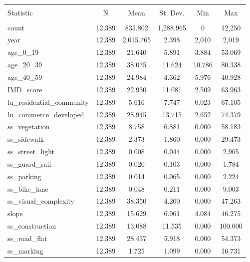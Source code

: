 
\begin{table}[!htbp] \centering 
  \caption{} 
  \label{} 
\begin{tabular}{@{\extracolsep{5pt}}lccccc} 
\\[-1.8ex]\hline 
\hline \\[-1.8ex] 
Statistic & \multicolumn{1}{c}{N} & \multicolumn{1}{c}{Mean} & \multicolumn{1}{c}{St. Dev.} & \multicolumn{1}{c}{Min} & \multicolumn{1}{c}{Max} \\ 
\hline \\[-1.8ex] 
count & 12,389 & 835.802 & 1,288.965 & 0 & 12,250 \\ 
year & 12,389 & 2,015.765 & 2.398 & 2,010 & 2,019 \\ 
age\_0\_19 & 12,389 & 21.640 & 5.891 & 3.884 & 53.069 \\ 
age\_20\_39 & 12,389 & 38.075 & 11.624 & 10.786 & 80.338 \\ 
age\_40\_59 & 12,389 & 24.984 & 4.362 & 5.976 & 40.928 \\ 
IMD\_score & 12,389 & 22.930 & 11.081 & 2.509 & 63.963 \\ 
lu\_residential\_community & 12,389 & 5.616 & 7.747 & 0.023 & 67.105 \\ 
lu\_commerce\_developed & 12,389 & 28.945 & 13.715 & 2.652 & 74.379 \\ 
ss\_vegetation & 12,389 & 8.758 & 6.881 & 0.000 & 58.183 \\ 
ss\_sidewalk & 12,389 & 2.373 & 1.860 & 0.000 & 29.473 \\ 
ss\_street\_light & 12,389 & 0.008 & 0.044 & 0.000 & 2.965 \\ 
ss\_guard\_rail & 12,389 & 0.020 & 0.103 & 0.000 & 1.784 \\ 
ss\_parking & 12,389 & 0.014 & 0.065 & 0.000 & 2.224 \\ 
ss\_bike\_lane & 12,389 & 0.048 & 0.211 & 0.000 & 9.003 \\ 
ss\_visual\_complexity & 12,389 & 38.350 & 4.200 & 0.000 & 47.263 \\ 
slope & 12,389 & 15.629 & 6.061 & 4.084 & 46.275 \\ 
ss\_construction & 12,389 & 13.088 & 11.535 & 0.000 & 100.000 \\ 
ss\_road\_flat & 12,389 & 28.437 & 5.918 & 0.000 & 54.373 \\ 
ss\_marking & 12,389 & 1.725 & 1.099 & 0.000 & 16.731 \\ 

\end{tabular}
\end{table}
